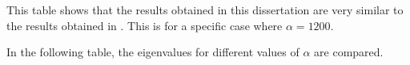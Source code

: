 \documentclass[../../main.tex]{subfiles}
\begin{document}

This table shows that the results obtained in this dissertation are very similar to the results obtained in \cite{LVV09}. This is for a specific case where $\alpha = 1200$.

In the following table, the eigenvalues for different values of $\alpha$ are compared.
\end{document}
